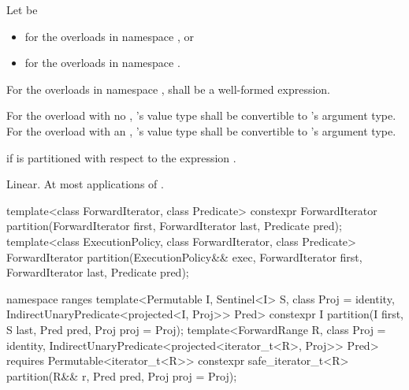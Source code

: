 \begin{itemdescr}
\begin{addedblock}
\pnum
Let  be
\begin{itemize}
\item {} for the overloads in namespace , or
\item {} for the overloads in
  namespace .
\end{itemize}

\pnum
\requires
For the overloads in namespace ,
 shall be a well-formed expression.
\end{addedblock}

\begin{removedblock}
\pnum
\requires For the overload with no ,
's value type shall be convertible to 's
argument type.  For the overload with an ,
's value type shall be convertible to 's
argument type.
\end{removedblock}

\pnum
\returns {} if 
 is  partitioned with respect to the expression
 .

\pnum
\complexity Linear. At most  applications of 
.
\end{itemdescr}


%
\begin{itemdecl}
template<class ForwardIterator, class Predicate>
  constexpr ForwardIterator
    partition(ForwardIterator first, ForwardIterator last, Predicate pred);
template<class ExecutionPolicy, class ForwardIterator, class Predicate>
  ForwardIterator
    partition(ExecutionPolicy&& exec,
              ForwardIterator first, ForwardIterator last, Predicate pred);
\end{itemdecl}
\begin{addedblock}
\begin{itemdecl}
namespace ranges {
  template<Permutable I, Sentinel<I> S, class Proj = identity,
      IndirectUnaryPredicate<projected<I, Proj>> Pred>
    constexpr I
      partition(I first, S last, Pred pred, Proj proj = Proj{});
  template<ForwardRange R, class Proj = identity,
      IndirectUnaryPredicate<projected<iterator_t<R>, Proj>> Pred>
    requires Permutable<iterator_t<R>>
    constexpr safe_iterator_t<R>
      partition(R&& r, Pred pred, Proj proj = Proj{});
}
\end{itemdecl}
\end{addedblock}

